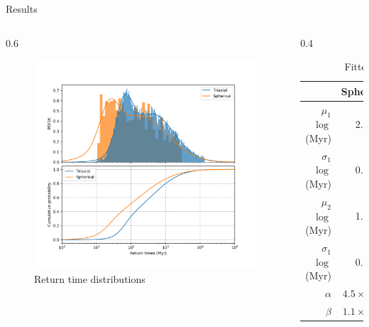 \documentclass{beamer}
\begin{document}
\begin{frame}{Results}
	\begin{columns}
		\begin{column}{0.6\textwidth}
			\begin{figure}[h]
				\centering
				\includegraphics[width = \linewidth]{"../Files/Week 14/dist_times"}
				\caption{Return time distributions}
				\label{fig: timeDist}
			\end{figure}
		\end{column}
		\begin{column}{0.4\textwidth}
			\begin{table}[h]
				\centering
				\caption{Fitted values}
				\tiny
				\begin{tabular}{r|cc}
					\hline
					& \textbf{Spherical} & \textbf{Triaxial} \\
					\hline
					$\mu_1$ $\log$(Myr) & 2.22 & 2.60\\
					$\sigma_1$ $\log$(Myr) & 0.81 & 0.64\\
					$\mu_2$ $\log$(Myr) & 1.36 & 1.81\\
					$\sigma_1$ $\log$(Myr) & 0.27 & 0.23\\
					$\alpha$ & $4.5\times10^{-4}$ & $3.5\times10^{-4}$\\
					$\beta$ & $1.1\times10^{-4}$ & $1.2\times10^{-4}$\\
					\hline
				\end{tabular}
			\end{table}
		\end{column}
	\end{columns}
\end{frame}
\end{document}
